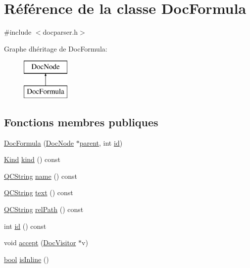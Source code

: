 \hypertarget{class_doc_formula}{}\section{Référence de la classe Doc\+Formula}
\label{class_doc_formula}


{\ttfamily \#include $<$docparser.\+h$>$}

Graphe d\textquotesingle{}héritage de Doc\+Formula\+:\begin{figure}[H]
\begin{center}
\leavevmode
\includegraphics[height=2.000000cm]{class_doc_formula}
\end{center}
\end{figure}
\subsection*{Fonctions membres publiques}
\begin{DoxyCompactItemize}
\item 
\hyperlink{class_doc_formula_a381ed9f6ea1bbfbf5b247f30470417b3}{Doc\+Formula} (\hyperlink{class_doc_node}{Doc\+Node} $\ast$\hyperlink{class_doc_node_a990d8b983962776a647e6231d38bd329}{parent}, int \hyperlink{class_doc_formula_a0726c71907cc5e0c094b51a9d241892f}{id})
\item 
\hyperlink{class_doc_node_aebd16e89ca590d84cbd40543ea5faadb}{Kind} \hyperlink{class_doc_formula_a1e0b1e16b62c6c470eb5e1599eefebee}{kind} () const 
\item 
\hyperlink{class_q_c_string}{Q\+C\+String} \hyperlink{class_doc_formula_a637dbc660f44394e3e1c83fb36b13ba3}{name} () const 
\item 
\hyperlink{class_q_c_string}{Q\+C\+String} \hyperlink{class_doc_formula_a4b89e5aa8d72ca35bbc470e076f821fe}{text} () const 
\item 
\hyperlink{class_q_c_string}{Q\+C\+String} \hyperlink{class_doc_formula_a2d32ac668b182f82d6fb1e058ef163d2}{rel\+Path} () const 
\item 
int \hyperlink{class_doc_formula_a0726c71907cc5e0c094b51a9d241892f}{id} () const 
\item 
void \hyperlink{class_doc_formula_a714e301b3a0805e3f117e42d3953b881}{accept} (\hyperlink{class_doc_visitor}{Doc\+Visitor} $\ast$v)
\item 
\hyperlink{qglobal_8h_a1062901a7428fdd9c7f180f5e01ea056}{bool} \hyperlink{class_doc_formula_a3ffb67844f3342f7f7ca97ad1b885cfb}{is\+Inline} ()
\end{DoxyCompactItemize}
